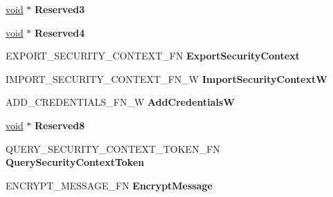 \begin{DoxyCompactItemize}
\hyperlink{interfacevoid}{void} $\ast$ {\bfseries Reserved3}
\item 
\mbox{\label{struct___s_e_c_u_r_i_t_y___f_u_n_c_t_i_o_n___t_a_b_l_e___w_a7ae051839688805df55c2bca55f174f3}} 
\hyperlink{interfacevoid}{void} $\ast$ {\bfseries Reserved4}
\item 
\mbox{\label{struct___s_e_c_u_r_i_t_y___f_u_n_c_t_i_o_n___t_a_b_l_e___w_a6663c5c19817cd9b45d16db759dbaa57}} 
E\+X\+P\+O\+R\+T\+\_\+\+S\+E\+C\+U\+R\+I\+T\+Y\+\_\+\+C\+O\+N\+T\+E\+X\+T\+\_\+\+FN {\bfseries Export\+Security\+Context}
\item 
\mbox{\label{struct___s_e_c_u_r_i_t_y___f_u_n_c_t_i_o_n___t_a_b_l_e___w_abdc9d986167cdd2b178c80b2eca24608}} 
I\+M\+P\+O\+R\+T\+\_\+\+S\+E\+C\+U\+R\+I\+T\+Y\+\_\+\+C\+O\+N\+T\+E\+X\+T\+\_\+\+F\+N\+\_\+W {\bfseries Import\+Security\+ContextW}
\item 
\mbox{\label{struct___s_e_c_u_r_i_t_y___f_u_n_c_t_i_o_n___t_a_b_l_e___w_a868498adad23392a12cd557535954cb5}} 
A\+D\+D\+\_\+\+C\+R\+E\+D\+E\+N\+T\+I\+A\+L\+S\+\_\+\+F\+N\+\_\+W {\bfseries Add\+CredentialsW}
\item 
\mbox{\label{struct___s_e_c_u_r_i_t_y___f_u_n_c_t_i_o_n___t_a_b_l_e___w_a4f72b403ba11f9ac782e4e36a2a3b30b}} 
\hyperlink{interfacevoid}{void} $\ast$ {\bfseries Reserved8}
\item 
\mbox{\label{struct___s_e_c_u_r_i_t_y___f_u_n_c_t_i_o_n___t_a_b_l_e___w_a2e12643b48c2114d868be4f36218451c}} 
Q\+U\+E\+R\+Y\+\_\+\+S\+E\+C\+U\+R\+I\+T\+Y\+\_\+\+C\+O\+N\+T\+E\+X\+T\+\_\+\+T\+O\+K\+E\+N\+\_\+\+FN {\bfseries Query\+Security\+Context\+Token}
\item 
\mbox{\label{struct___s_e_c_u_r_i_t_y___f_u_n_c_t_i_o_n___t_a_b_l_e___w_a398cdaa2ddd2cc97fda2f96a7c9db49a}} 
E\+N\+C\+R\+Y\+P\+T\+\_\+\+M\+E\+S\+S\+A\+G\+E\+\_\+\+FN {\bfseries Encrypt\+Message}
\item 

\end{DoxyCompactItemize}
